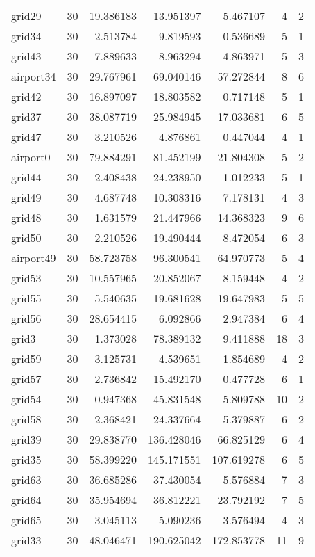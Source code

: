 \begin{longtable}{|l|r|r|r|r|r|r|}
grid29 & 30 & 19.386183 & 13.951397 & 5.467107 & 4 & 2 \\
grid34 & 30 & 2.513784 & 9.819593 & 0.536689 & 5 & 1 \\
grid43 & 30 & 7.889633 & 8.963294 & 4.863971 & 5 & 3 \\
airport34 & 30 & 29.767961 & 69.040146 & 57.272844 & 8 & 6 \\
grid42 & 30 & 16.897097 & 18.803582 & 0.717148 & 5 & 1 \\
grid37 & 30 & 38.087719 & 25.984945 & 17.033681 & 6 & 5 \\
grid47 & 30 & 3.210526 & 4.876861 & 0.447044 & 4 & 1 \\
airport0 & 30 & 79.884291 & 81.452199 & 21.804308 & 5 & 2 \\
grid44 & 30 & 2.408438 & 24.238950 & 1.012233 & 5 & 1 \\
grid49 & 30 & 4.687748 & 10.308316 & 7.178131 & 4 & 3 \\
grid48 & 30 & 1.631579 & 21.447966 & 14.368323 & 9 & 6 \\
grid50 & 30 & 2.210526 & 19.490444 & 8.472054 & 6 & 3 \\
airport49 & 30 & 58.723758 & 96.300541 & 64.970773 & 5 & 4 \\
grid53 & 30 & 10.557965 & 20.852067 & 8.159448 & 4 & 2 \\
grid55 & 30 & 5.540635 & 19.681628 & 19.647983 & 5 & 5 \\
grid56 & 30 & 28.654415 & 6.092866 & 2.947384 & 6 & 4 \\
grid3 & 30 & 1.373028 & 78.389132 & 9.411888 & 18 & 3 \\
grid59 & 30 & 3.125731 & 4.539651 & 1.854689 & 4 & 2 \\
grid57 & 30 & 2.736842 & 15.492170 & 0.477728 & 6 & 1 \\
grid54 & 30 & 0.947368 & 45.831548 & 5.809788 & 10 & 2 \\
grid58 & 30 & 2.368421 & 24.337664 & 5.379887 & 6 & 2 \\
grid39 & 30 & 29.838770 & 136.428046 & 66.825129 & 6 & 4 \\
grid35 & 30 & 58.399220 & 145.171551 & 107.619278 & 6 & 5 \\
grid63 & 30 & 36.685286 & 37.430054 & 5.576884 & 7 & 3 \\
grid64 & 30 & 35.954694 & 36.812221 & 23.792192 & 7 & 5 \\
grid65 & 30 & 3.045113 & 5.090236 & 3.576494 & 4 & 3 \\
grid33 & 30 & 48.046471 & 190.625042 & 172.853778 & 11 & 9 \\

\end{longtable}
